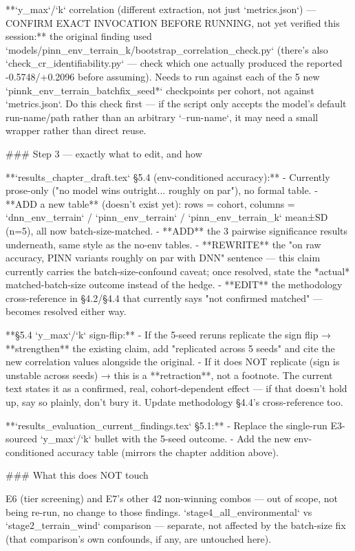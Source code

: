 **`y_max`/`k` correlation (different extraction, not just `metrics.json`) — CONFIRM EXACT
INVOCATION BEFORE RUNNING, not yet verified this session:** the original finding used
`models/pinn_env_terrain_k/bootstrap_correlation_check.py` (there's also
`check_cr_identifiability.py` — check which one actually produced the reported -0.5748/+0.2096
before assuming). Needs to run against each of the 5 new `pinnk_env_terrain_batchfix_seed*`
checkpoints per cohort, not against `metrics.json`. Do this check first — if the script only
accepts the model's default run-name/path rather than an arbitrary `--run-name`, it may need a
small wrapper rather than direct reuse.

### Step 3 — exactly what to edit, and how

**`results_chapter_draft.tex` §5.4 (env-conditioned accuracy):**
- Currently prose-only ("no model wins outright... roughly on par"), no formal table.
- **ADD a new table** (doesn't exist yet): rows = cohort, columns = `dnn_env_terrain` /
  `pinn_env_terrain` / `pinn_env_terrain_k` mean±SD (n=5), all now batch-size-matched.
- **ADD** the 3 pairwise significance results underneath, same style as the no-env tables.
- **REWRITE** the "on raw accuracy, PINN variants roughly on par with DNN" sentence — this
  claim currently carries the batch-size-confound caveat; once resolved, state the *actual*
  matched-batch-size outcome instead of the hedge.
- **EDIT** the methodology cross-reference in §4.2/§4.4 that currently says "not confirmed
  matched" — becomes resolved either way.

**§5.4 `y_max`/`k` sign-flip:**
- If the 5-seed reruns replicate the sign flip → **strengthen** the existing claim, add "replicated
  across 5 seeds" and cite the new correlation values alongside the original.
- If it does NOT replicate (sign is unstable across seeds) → this is a **retraction**, not a footnote.
  The current text states it as a confirmed, real, cohort-dependent effect — if that doesn't hold up,
  say so plainly, don't bury it. Update methodology §4.4's cross-reference too.

**`results_evaluation_current_findings.tex` §5.1:**
- Replace the single-run E3-sourced `y_max`/`k` bullet with the 5-seed outcome.
- Add the new env-conditioned accuracy table (mirrors the chapter addition above).

### What this does NOT touch

E6 (tier screening) and E7's other 42 non-winning combos — out of scope, not being re-run, no
change to those findings. `stage4_all_environmental` vs `stage2_terrain_wind` comparison — separate,
not affected by the batch-size fix (that comparison's own confounds, if any, are untouched here).
